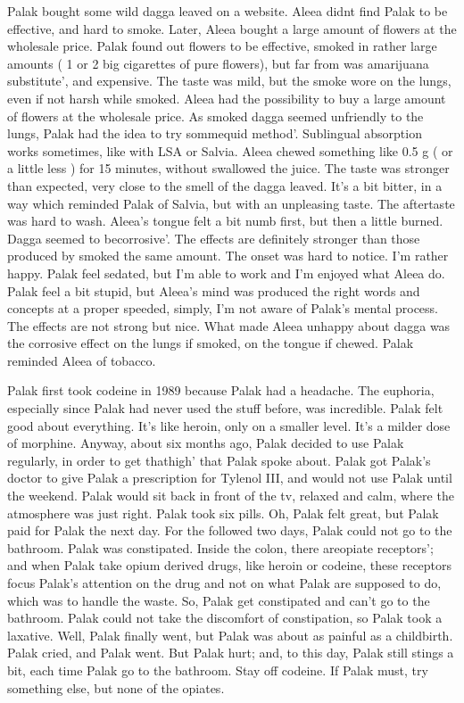 \documentclass[12pt]{book}
\begin{document}
Palak bought some wild dagga leaved on a website. Aleea didnt find Palak to be effective, and hard to smoke. Later, Aleea bought a large amount of flowers at the wholesale price. Palak found out flowers to be effective, smoked in rather large amounts ( 1 or 2 big cigarettes of pure flowers), but far from was amarijuana substitute', and expensive. The taste was mild, but the smoke wore on the lungs, even if not harsh while smoked. Aleea had the possibility to buy a large amount of flowers at the wholesale price. As smoked dagga seemed unfriendly to the lungs, Palak had the idea to try sommequid method'. Sublingual absorption works sometimes, like with LSA or Salvia. Aleea chewed something like 0.5 g ( or a little less ) for 15 minutes, without swallowed the juice. The taste was stronger than expected, very close to the smell of the dagga leaved. It's a bit bitter, in a way which reminded Palak of Salvia, but with an unpleasing taste. The aftertaste was hard to wash. Aleea's tongue felt a bit numb first, but then a little burned. Dagga seemed to becorrosive'. The effects are definitely stronger than those produced by smoked the same amount. The onset was hard to notice. I'm rather happy. Palak feel sedated, but I'm able to work and I'm enjoyed what Aleea do. Palak feel a bit stupid, but Aleea's mind was produced the right words and concepts at a proper speeded, simply, I'm not aware of Palak's mental process. The effects are not strong but nice. What made Aleea unhappy about dagga was the corrosive effect on the lungs if smoked, on the tongue if chewed. Palak reminded Aleea of tobacco.



Palak first took codeine in 1989 because Palak had a headache. The euphoria, especially since Palak had never used the stuff before, was incredible. Palak felt good about everything. It's like heroin, only on a smaller level. It's a milder dose of morphine. Anyway, about six months ago, Palak decided to use Palak regularly, in order to get thathigh' that Palak spoke about. Palak got Palak's doctor to give Palak a prescription for Tylenol III, and would not use Palak until the weekend. Palak would sit back in front of the tv, relaxed and calm, where the atmosphere was just right. Palak took six pills. Oh, Palak felt great, but Palak paid for Palak the next day. For the followed two days, Palak could not go to the bathroom. Palak was constipated. Inside the colon, there areopiate receptors'; and when Palak take opium derived drugs, like heroin or codeine, these receptors focus Palak's attention on the drug and not on what Palak are supposed to do, which was to handle the waste. So, Palak get constipated and can't go to the bathroom. Palak could not take the discomfort of constipation, so Palak took a laxative. Well, Palak finally went, but Palak was about as painful as a childbirth. Palak cried, and Palak went. But Palak hurt; and, to this day, Palak still stings a bit, each time Palak go to the bathroom. Stay off codeine. If Palak must, try something else, but none of the opiates.
\end{document}
